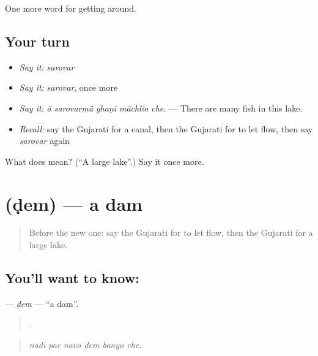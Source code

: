 \begin{grammarlens}[title={What you've built}]
One more word for getting around.
\end{grammarlens}

\subsection*{Your turn}
\begin{itemize}
\raggedright
  \item \emph{Say it:} \emph{sarovar}
  \item \emph{Say it:} \emph{sarovar}, once more
  \item \emph{Say it:} \emph{ā sarovarmā̃ ghaṇī māchlīo che.} — There are many fish in this lake.
  \item \emph{Recall:} say the Gujarati for a canal, then the Gujarati for to let flow, then say \emph{sarovar} again
\end{itemize}

\begin{tcolorbox}[breakable,colback=teal!4,colframe=teal!35!black,title={Before you move on}]
What does  mean? (\textquotedblleft{}A large lake\textquotedblright{}.) Say it once more.
\end{tcolorbox}
\section[\texorpdfstring{\gu{ડેમ} (ḍem)}{ડેમ (ḍem)}]{ (ḍem) — a dam}

\label{lesson:GU-C441-dem}



\begin{quote}
Before the new one: say the Gujarati for to let flow, then the Gujarati for a large lake.
\end{quote}

\subsection*{You'll want to know: }
\textbf{} — \emph{ḍem} — \textquotedblleft{}a dam\textquotedblright{}.

\begin{quote}
     .
\end{quote}

\begin{quote}
\emph{nadī par navo ḍem banyo che.}
\end{quote}

